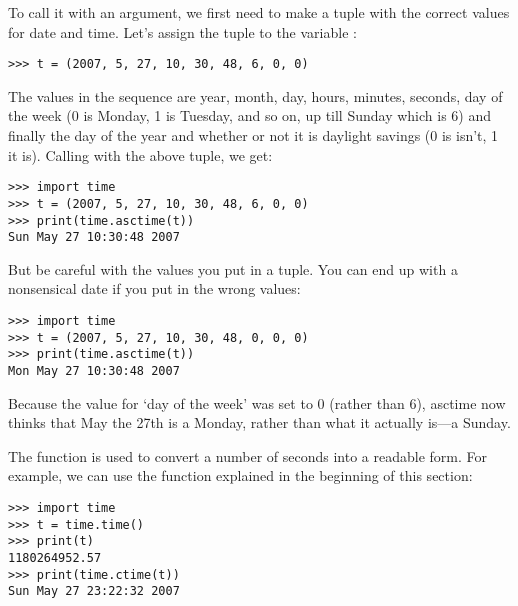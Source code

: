 \noindent
To call it with an argument, we first need to make a tuple with the correct values for date and time.  Let's assign the tuple to the variable :

\begin{listing}
\begin{verbatim}
>>> t = (2007, 5, 27, 10, 30, 48, 6, 0, 0)
\end{verbatim}
\end{listing}

\noindent
The values in the sequence are year, month, day, hours, minutes, seconds, day of the week (0 is Monday, 1 is Tuesday, and so on, up till Sunday which is 6) and finally the day of the year and whether or not it is daylight savings (0 is isn't, 1 it is). Calling  with the above tuple, we get:

\begin{listing}
\begin{verbatim}
>>> import time
>>> t = (2007, 5, 27, 10, 30, 48, 6, 0, 0)
>>> print(time.asctime(t))
Sun May 27 10:30:48 2007
\end{verbatim}
\end{listing}

\noindent
But be careful with the values you put in a tuple. You can end up with a nonsensical date if you put in the wrong values:

\begin{listing}
\begin{verbatim}
>>> import time
>>> t = (2007, 5, 27, 10, 30, 48, 0, 0, 0)
>>> print(time.asctime(t))
Mon May 27 10:30:48 2007
\end{verbatim}
\end{listing}

\noindent
Because the value for `day of the week' was set to 0 (rather than 6), asctime now thinks that May the 27th is a Monday, rather than what it actually is---a Sunday.

The function  is used to convert a number of seconds into a readable form.  For example, we can use the  function explained in the beginning of this section:

\begin{listingignore}
\begin{verbatim}
>>> import time
>>> t = time.time()
>>> print(t)
1180264952.57
>>> print(time.ctime(t))
Sun May 27 23:22:32 2007
\end{verbatim}
\end{listingignore}

